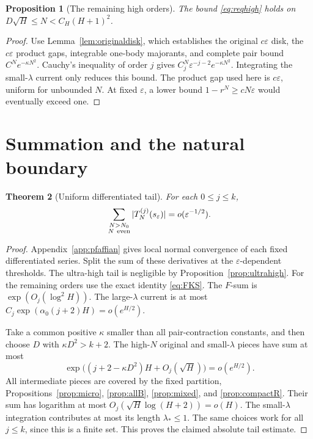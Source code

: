 \documentclass[11pt]{article}
\numberwithin{equation}{section}
\newtheorem{theorem}{Theorem}[section]
\newtheorem{proposition}[theorem]{Proposition}
\theoremstyle{definition}
\newcommand{\eps}{\varepsilon}
\newcommand{\se}{s_\varepsilon}
\begin{document}
\begin{proposition}[The remaining high orders]\label{prop:highKS}
The bound \eqref{eq:reqhigh} holds on
\(D\sqrt H\le N<C_H(H+1)^2\).
\end{proposition}
\begin{proof}
Use Lemma~\ref{lem:originaldisk}, which establishes the original
\(c\eps\) disk, the \(c\eps\) product gaps, integrable one-body
majorants, and complete pair bound \(C^Ne^{-\kappa N^2}\).
Cauchy's inequality of order \(j\) gives
\(C_j^N\eps^{-j-2}e^{-\kappa N^2}\).
Integrating the small-\(\lambda\) current only reduces this bound.
The product gap used here is \(c\eps\), uniform for unbounded \(N\).
At fixed \(\eps\), a lower bound \(1-r^N\ge cN\eps\) would eventually
exceed one.
\end{proof}



\section{Summation and the natural boundary}
\label{sec:conclusion}

\begin{theorem}[Uniform differentiated tail]\label{thm:tail}
For each \(0\le j\le k\),
\[
 \sum_{\substack{N>N_0\\N\ {\rm even}}}|T_N^{(j)}(\se)|
                =o(\eps^{-1/2}).
\]
\end{theorem}
\begin{proof}
Appendix~\ref{app:pfaffian} gives local normal convergence of each
fixed differentiated series. Split the sum of these derivatives at
the \(\eps\)-dependent thresholds.
The ultra-high tail is negligible by Proposition~\ref{prop:ultrahigh}.
For the remaining orders use the exact identity \eqref{eq:FKS}.
The \(F\)-sum is \(\exp(O_j(\log^2H))\).
The large-\(\lambda\) current is at most
\(C_j\exp(\alpha_0(j+2)H)=o(e^{H/2})\).

Take a common positive \(\kappa\) smaller than all pair-contraction
constants, and then choose \(D\) with \(\kappa D^2>k+2\).
The high-\(N\) original and small-\(\lambda\) pieces have sum at most
\[
 \exp\bigl((j+2-\kappa D^2)H+O_j(\sqrt H)\bigr)=o(e^{H/2}).
\]
All intermediate pieces are covered by the fixed partition,
Propositions~\ref{prop:micro}, \ref{prop:allB}, \ref{prop:mixed},
and \ref{prop:compactR}. Their sum has logarithm at most
\(O_j(\sqrt H\log(H+2))=o(H)\).
The small-\(\lambda\) integration contributes at most its length
\(\lambda_*\le1\). The same choices work for all \(j\le k\), since
this is a finite set. This proves the claimed absolute tail estimate.
\end{proof}
\end{document}
